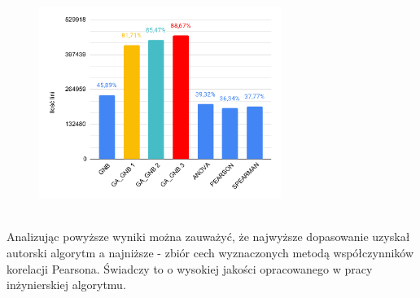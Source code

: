 \begin{figure}[H]
    \centering
    \includegraphics[width=0.7\textwidth]{images/Monday-WorkingHours_cmp}
    \label{fig:mond}
\end{figure}
\ \\
Analizując powyższe wyniki można zauważyć, że najwyższe dopasowanie uzyskał autorski algorytm a najniższe - zbiór cech wyznaczonych metodą współczynników korelacji Pearsona. Świadczy to o wysokiej jakości opracowanego w pracy inżynierskiej algorytmu.

